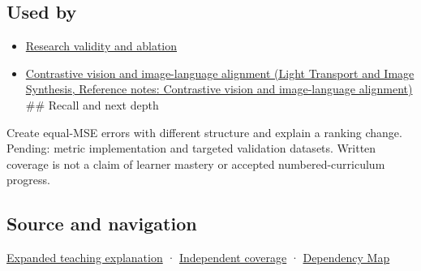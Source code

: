 \subsection{Used by}\label{appendix-b2c1846508bf-used-by}

\hypertarget{appendix-b2c1846508bf-used-by}{}

\begin{itemize}
\item
  \hyperref[appendix-65788587ef78]{Research validity and ablation}
\item
  \href{../04-Light-Transport-and-Image-Synthesis/main.pdf\#nameddest=appendix-772f1fd96148}{Contrastive vision and image-language alignment (Light Transport and Image Synthesis, Reference notes: Contrastive vision and image-language alignment)} \#\# Recall and next depth
\end{itemize}

Create equal-MSE errors with different structure and explain a ranking change. Pending: metric implementation and targeted validation datasets. Written coverage is not a claim of learner mastery or accepted numbered-curriculum progress.

\subsection{Source and navigation}\label{appendix-b2c1846508bf-source-and-navigation}

\hypertarget{appendix-b2c1846508bf-source-and-navigation}{}

\hyperref[04-visual-computing-ii-ch042-quality-numbers-need-a-question-they-can-actually-answer]{Expanded teaching explanation} · \hyperref[appendix-fd090d982a15-xr01---independent-seeing-and-representation-source]{Independent coverage} · \hyperref[appendix-4ad47bdd269a]{Dependency Map}
